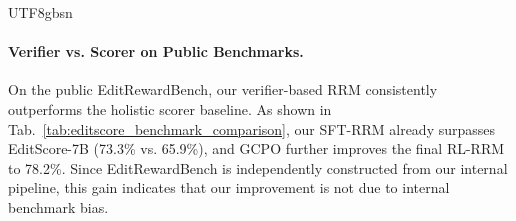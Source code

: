 \documentclass{llmxive}
\providecommand{\arraystretch}{1.25}
\begin{document}
\begin{CJK*}{UTF8}{gbsn}
\paragraph{Verifier vs. Scorer on Public Benchmarks.}
On the public EditRewardBench, our verifier-based RRM consistently outperforms the holistic scorer baseline. As shown in Tab.~\ref{tab:editscore_benchmark_comparison}, our SFT-RRM already surpasses EditScore-7B (73.3\% vs. 65.9\%), and GCPO further improves the final RL-RRM to 78.2\%. Since EditRewardBench is independently constructed from our internal pipeline, this gain indicates that our improvement is not due to internal benchmark bias. 
\begin{table}[t]
\centering
\renewcommand{\arraystretch}{1.25} 
\end{table}
\end{CJK*}
\end{document}
